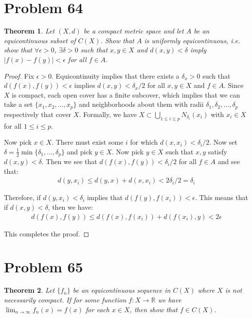 \documentclass[psamsfonts]{amsart}
\newtheorem{thm}{Theorem}[section]
\theoremstyle{definition}
\theoremstyle{remark}
\numberwithin{equation}{section}
\begin{document}
\section{Problem 64}

\begin{thm}
Let $(X,d)$ be a compact metric space and let $A$ be an equicontinuous subset of $C(X)$. Show that $A$ is uniformly equicontinuous, i.e. show that $\forall \epsilon > 0$, $\exists \delta > 0$ such that $x,y \in X$ and $d(x,y) < \delta$ imply $|f(x) - f(y)| < \epsilon$ for all $f \in A$. 
\end{thm}

\begin{proof}
Fix $\epsilon > 0$. Equicontinuity implies that there exists a $\delta_x >0$ such that $d(f(x) ,f(y)) < \epsilon$ implies $d(x,y) < \delta_x/2$ for all $x,y \in X$ and $f \in A$. Since $X$ is compact, each open cover has a finite subcover, which implies that we can take a set $\{ x_1, x_2, \ldots, x_p \}$ and neighborhoods about them with radii $\delta_1, \delta_2, \ldots, \delta_p$ respectively that cover $X$. Formally, we have $X \subset \bigcup_{1 \leq i \leq p} N_{\delta_i}(x_i)$ with $x_i \in X$ for all $1 \leq i \leq p$. 

Now pick $x \in X$. There must exist some $i$ for which $d(x,x_i) < \delta_i/2$. Now set $\delta = \frac{1}{2} \min \{ \delta_1, \ldots, \delta_p \}$ and pick $y \in X$. Now pick $y \in X$ such that $x,y$ satisfy $d(x,y) < \delta$. Then we see that $d(f(x),f(y)) < \delta_i/2$ for all $f \in A$ and see that:
\begin{eqnarray}
d(y,x_i) \leq d(y,x) + d(x,x_i) < 2 \delta_i/2 = \delta_i
\end{eqnarray}

Therefore, if $d(y,x_i) < \delta_i$ implies that $d(f(y),f(x_i)) < \epsilon$. This means that if $d(x,y) < \delta$, then we have:
\begin{eqnarray}
d(f(x),f(y)) \leq d(f(x),f(x_i)) + d(f(x_i),y) < 2 \epsilon
\end{eqnarray}

This completes the proof.
\end{proof}

\section{Problem 65}

\begin{thm}
Let $\{ f_n \}$ be an equicontinuous sequence in $C(X)$ where $X$ is not necessarily compact. If for some function $f: X \to \mathbb{R}$ we have $\lim_{n \to \infty} f_n(x) = f(x)$ for each $x \in X$, then show that $f \in C(X)$. 
\end{thm}
\end{document}
